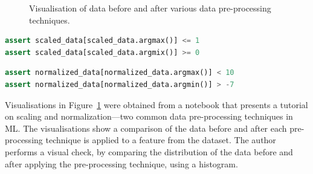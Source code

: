 \begin{figure}
  \caption{Visualisation of data before and after various data pre-processing techniques.}
  \label{fig:data-pre-process}
\end{figure}

\begin{lstlisting}[language=Python, caption={Assertion to check that the mix and max of a feature fall within specified threshold derived from the visualisation presented in Figure~\ref{fig:scale}.}, label={lst:scale}]
assert scaled_data[scaled_data.argmax()] <= 1
assert scaled_data[scaled_data.argmix()] >= 0
\end{lstlisting}

\begin{lstlisting}[language=Python, caption={Similar premise as Listing~\ref{lst:scale}, however this assertion is based on Figure~\ref{fig:normal}.}, label={lst:normal}]
assert normalized_data[normalized_data.argmax()] < 10
assert normalized_data[normalized_data.argmin()] > -7
\end{lstlisting}

Visualisations in Figure~\ref{fig:data-pre-process} were obtained from a notebook that presents a tutorial on scaling and normalization---two common data pre-processing techniques in ML. The visualisations show a comparison of the data before and after each pre-processing technique is applied to a feature from the dataset. The author performs a visual check, by comparing the distribution of the data before and after applying the pre-processing technique, using a histogram.

